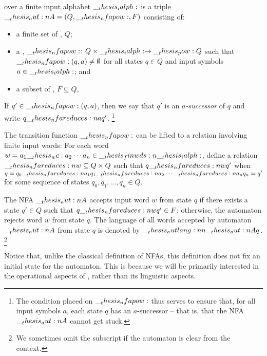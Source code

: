 \begin{definition}\label{def:finite-automata:nfa}
  \emph{}
   over a finite input alphabet $\__thesis_ialph:$ is a triple $\__thesis_aut:n {A} = (Q, \__thesis_nfapow:, F)$ consisting of:
  \begin{itemize}
  \item a finite set of , $Q$;
  \item a , $\__thesis_nfapow:\colon Q \times \__thesis_ialph: \to \__thesis_pow: {Q}$ such that $\__thesis_nfapow:(q, a) \neq \emptyset$ for all states $q \in Q$ and input symbols $a \in \__thesis_ialph:$; and
  \item a subset of , $F \subseteq Q$,
  \end{itemize}
  If $q' \in \__thesis_nfapow:(q, a)$, then we say that $q'$ is an \emph{$a$-successor} of $q$ and write $q \nfareduces[a] q'$.%
  \footnote{The condition placed on $\__thesis_nfapow:$ thus serves to ensure that, for all input symbols $a$, each state $q$ has an $a$-successor -- that is, that the \ac{NFA} $\__thesis_aut:n {A}$ cannot get stuck.}

  The transition function $\__thesis_nfapow:$ can be lifted to a relation involving finite input words: For each word $w = a_1 \wc a_2 \dotsm a_n \in \finwds{\ialph}$, define a relation $\mathord{\nfareduces[\smash{w}]} \subseteq Q \times Q$ such that $q \nfareduces[w] q'$ when $q = q_0 \nfareduces[a_1] q_1 \nfareduces[a_2] \dotsb \nfareduces[a_n] q_n = q'$ for some sequence of states $q_0, q_1, \dotsc, q_n \in Q$.

  The \ac{NFA} $\__thesis_aut:n {A}$ accepts input word $w$ from state $q$ if there exists a state $q' \in Q$ such that $q \nfareduces[w] q' \in F$;
  otherwise, the automaton rejects word $w$ from state $q$.
  The language of all words accepted by automaton $\__thesis_aut:n {A}$ from state $q$ is denoted by $\__thesis_autlang:nn {\__thesis_aut:n {A}} {q}$.%
  \footnote{We sometimes omit the subscript if the automaton is clear from the context.}
\end{definition}

Notice that, unlike the classical definition of \acp{NFA}, this definition does not fix an initial state for the automaton.
This is because we will be primarily interested in the operational aspects of , rather than its linguistic aspects.

